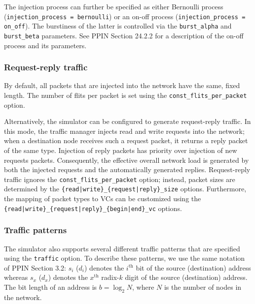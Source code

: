 \documentclass[11pt]{article}
\begin{document}
The injection process can further be specified as either Bernoulli process 
(\texttt{injection\_process = bernoulli}) or an on-off process
(\texttt{injection\_process = on\_off}).  The burstiness of the latter
is controlled via the \texttt{burst\_alpha} and
\texttt{burst\_beta} parameters.  See PPIN Section 24.2.2 for a
description of the on-off process and its parameters.

\subsubsection{Request-reply traffic}
By default, all packets that are injected into the network have the same, 
fixed length. The number of flits per packet is set using the
\texttt{const\_flits\_per\_packet} option. 

Alternatively, the simulator can be configured to generate request-reply 
traffic. In this mode, the traffic manager injects read and write requests 
into the network; when a destination node receives such a request 
packet, it returns a reply packet of the same type. Injection of reply 
packets has priority over injection of new requests packets. 
Consequently, the effective overall network load is generated by both 
the injected requests and the automatically generated replies. 
Request-reply traffic ignores the \texttt{const\_flits\_per\_packet} 
option; instead, packet sizes are determined by the 
\texttt{\{read|write\}\_\{request|reply\}\_size} options. Furthermore, 
the mapping of packet types to VCs can be customized using the 
\texttt{\{read|write\}\_\{request|reply\}\_\{begin|end\}\_vc} options.

\subsubsection{Traffic patterns}
The simulator also supports several different traffic patterns that
are specified using the \texttt{traffic} option.  To describe these
patterns, we use the same notation of PPIN Section 3.2: $s_i$ ($d_i$)
denotes the $i^\textrm{th}$ bit of the source (destination) address
whereas $s_x$ ($d_x$) denotes the $x^\textrm{th}$ radix-$k$ digit of
the source (destination) address.  The bit length of an address is $b
= \log_2 N$, where $N$ is the number of nodes in the network.
\end{document}
